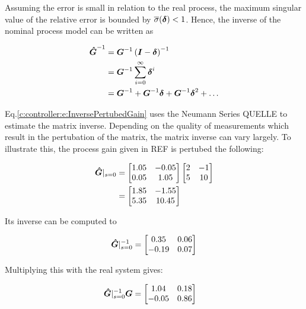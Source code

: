 Assuming the error is small in relation to the real process, the maximum singular value of the relative error is bounded by $\overline{\sigma}(\mbox{\boldmath$\delta$}) < 1$. Hence, the inverse of the nominal process model can be written as

\begin{align}
\begin{split}
\mbox{\boldmath$\hat{G}$}^{-1} &= \mbox{\boldmath$G$}^{-1} \left( \mbox{\boldmath$I$} - \mbox{\boldmath$\delta$} \right)^{-1} \\
&= \mbox{\boldmath$G$}^{-1} \sum_{i=0}^\infty \mbox{\boldmath$\delta$}^i  \\
&= \mbox{\boldmath$G$}^{-1} + \mbox{\boldmath$G$}^{-1} \mbox{\boldmath$\delta$} + \mbox{\boldmath$G$}^{-1}\mbox{\boldmath$\delta$}^2 + \dots
\end{split}
\label{c:controller:e:InversePertubedGain}
\end{align}

Eq.\ref{c:controller:e:InversePertubedGain} uses the Neumann Series QUELLE to estimate the matrix inverse. Depending on the quality of measurements which result in the pertubation of the matrix, the matrix inverse can vary largely. To illustrate this, the process gain given in REF is pertubed the following:

\begin{align}
\begin{split}
\mbox{\boldmath$\hat{G}$}|_{s=0} &= \begin{bmatrix} 
1.05 & -0.05 \\
0.05 & 1.05
\end{bmatrix}
\begin{bmatrix}
2 & -1 \\
5 & 10
\end{bmatrix} \\
&= \begin{bmatrix}
1.85 & -1.55 \\
5.35 & 10.45
\end{bmatrix}
\end{split}
\label{c:controller:e:PertubedExample}
\end{align}

Its inverse can be computed to

\begin{align}
\mbox{\boldmath$\hat{G}$}|_{s=0}^{-1} = \begin{bmatrix}
0.35 & 0.06  \\
-0.19 & 0.07
\end{bmatrix}
\end{align}

Multiplying this with the real system gives:

\begin{align}
\begin{split}
\mbox{\boldmath$\hat{G}$}|_{s=0}^{-1} \mbox{\boldmath$G$} &= \begin{bmatrix}
1.04 & 0.18 \\
-0.05 & 0.86
\end{bmatrix}
\end{split}
\label{c:controller:PertubedMultiply}
\end{align}

